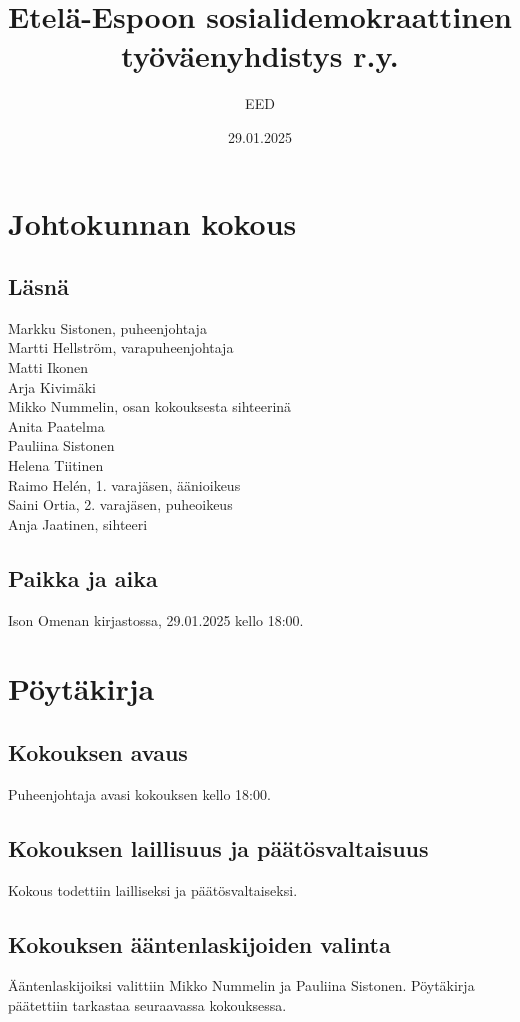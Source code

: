 \documentclass[a4paper,12pt]{article}
\title{Etelä-Espoon sosialidemokraattinen työväenyhdistys r.y.}
\author{EED}
\date{29.01.2025}
\begin{document}
\maketitle
\tableofcontents
\section*{Johtokunnan kokous}
\subsection*{Läsnä}
\begin{flushleft}
  Markku Sistonen, puheenjohtaja \\
  Martti Hellström, varapuheenjohtaja \\
  Matti Ikonen \\
  Arja Kivimäki \\
  Mikko Nummelin, osan kokouksesta sihteerinä \\
  Anita Paatelma \\
  Pauliina Sistonen \\
  Helena Tiitinen \\
  Raimo Helén, 1. varajäsen, äänioikeus \\
  Saini Ortia, 2. varajäsen, puheoikeus \\
  Anja Jaatinen, sihteeri
\end{flushleft}
\subsection*{Paikka ja aika}
Ison Omenan kirjastossa, 29.01.2025 kello 18:00.
\section*{Pöytäkirja}
\subsection{Kokouksen avaus}
Puheenjohtaja avasi kokouksen kello 18:00.
\subsection{Kokouksen laillisuus ja päätösvaltaisuus}
Kokous todettiin lailliseksi ja päätösvaltaiseksi.
\subsection{Kokouksen ääntenlaskijoiden valinta}
Ääntenlaskijoiksi valittiin Mikko Nummelin ja Pauliina Sistonen. Pöytäkirja päätettiin tarkastaa seuraavassa kokouksessa.
\end{document}
